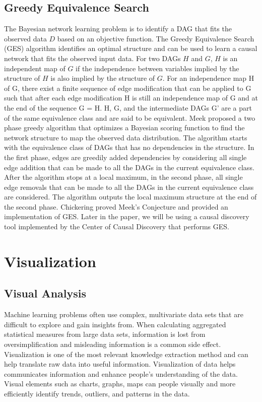 \subsection{Greedy Equivalence Search}
The Bayesian network learning problem is to identify a DAG that fits the observed data \(D\) based on an objective function. The Greedy Equivalence Search (GES) algorithm \cite{GES} identifies an optimal structure and can be used to learn a causal network that fits the observed input data. For two DAGs \(H\) and \(G\), \(H\) is an independent map of \(G\) if the independence between variables implied by the structure of \(H\) is also implied by the structure of \(G\). For an independence map H of G, there exist a finite sequence of edge modification that can be applied to G such that after each edge modification H is still an independence map of G and at the end of the sequence G = H. H, G, and the intermediate DAGs G' are a part of the same equivalence class and are said to be equivalent. Meek proposed a two phase greedy algorithm that optimizes a Bayesian scoring function to find the network structure to map the observed data distribution. The algorithm starts with the equivalence class of DAGs that has no dependencies in the structure. In the first phase, edges are greedily added dependencies by considering all single edge addition that can be made to all the DAGs in the current equivalence class. After the algorithm stops at a local maximum, in the second phase, all single edge removals that can be made to all the DAGs in the current equivalence class are considered. The algorithm outputs the local maximum structure at the end of the second phase. Chickering \cite{GES} proved Meek's Conjecture and provided an implementation of GES. Later in the paper, we will be using a causal discovery tool \cite{Pycausal} implemented by the Center of Causal Discovery that performs GES.

\section{Visualization}
\subsection{Visual Analysis}
\indent Machine learning problems often use complex, multivariate data sets that are difficult to explore and gain insights from. When calculating aggregated statistical measures from large data sets, information is lost from oversimplification and misleading information is a common side effect. Visualization is one of the most relevant knowledge extraction method and can help translate raw data into useful information. Visualization of data helps communicates information and enhance people’s understanding of the data. Visual elements such as charts, graphs, maps can people visually and more efficiently identify trends, outliers, and patterns in the data. 

